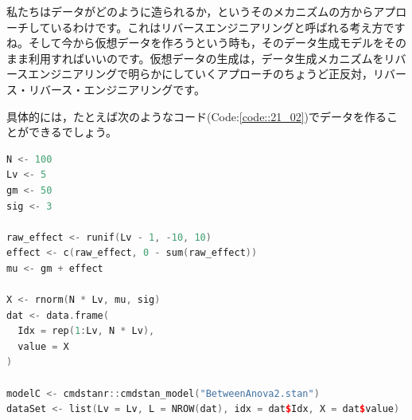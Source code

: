 \documentclass{ltjsbook}
\begin{document}
私たちはデータがどのように造られるか，というそのメカニズムの方からアプローチしているわけです。これはリバースエンジニアリングと呼ばれる考え方ですね。そして今から仮想データを作ろうという時も，そのデータ生成モデルをそのまま利用すればいいのです。仮想データの生成は，データ生成メカニズムをリバースエンジニアリングで明らかにしていくアプローチのちょうど正反対，リバース・リバース・エンジニアリングです。

具体的には，たとえば次のようなコード(Code:\ref{code::21_02})でデータを作ることができるでしょう。
\begin{lstlisting}[language=c++,label={code::21_02},caption={リバースエンジニアリング}]
N <- 100
Lv <- 5
gm <- 50
sig <- 3

raw_effect <- runif(Lv - 1, -10, 10)
effect <- c(raw_effect, 0 - sum(raw_effect))
mu <- gm + effect

X <- rnorm(N * Lv, mu, sig)
dat <- data.frame(
  Idx = rep(1:Lv, N * Lv),
  value = X
)

modelC <- cmdstanr::cmdstan_model("BetweenAnova2.stan")
dataSet <- list(Lv = Lv, L = NROW(dat), idx = dat$Idx, X = dat$value)
\end{lstlisting}
\end{document}
